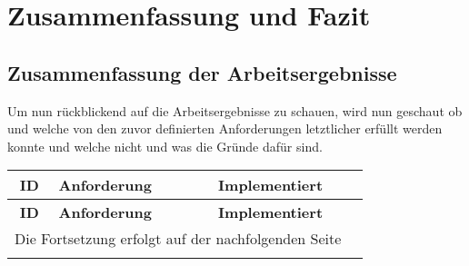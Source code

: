 
\chapter{Zusammenfassung und Fazit }
\label{chapter:7}

\section{Zusammenfassung der Arbeitsergebnisse}

Um nun rückblickend auf die Arbeitsergebnisse zu schauen, wird nun geschaut ob und welche von den zuvor definierten Anforderungen letztlicher erfüllt werden konnte und welche nicht und was die Gründe dafür sind.

\begin{longtable}{|c|l|c|c|}

    \hline
    \textbf{ID}          &
    \textbf{Anforderung} &
    \textbf{Implementiert}                                                                 \\ \hline
    \endfirsthead

    \hline
    \textbf{ID}          &
    \textbf{Anforderung} &
    \textbf{Implementiert}                                                                 \\ \hline
    \endhead

    \hline
    \multicolumn{3}{|r|}{{Die Fortsetzung erfolgt auf der nachfolgenden Seite}}            \\ \hline
    \endfoot

    \endlastfoot


\end{longtable}
